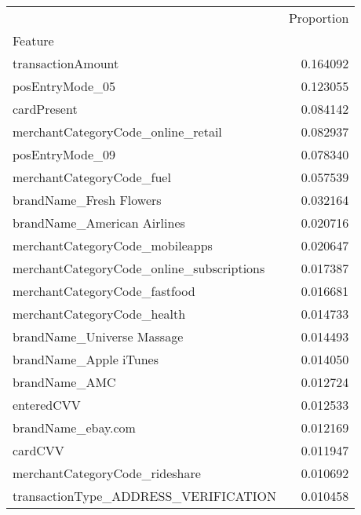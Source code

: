 \begin{tabu}{lr}
\toprule
 & Proportion \\
Feature &  \\
\midrule
transactionAmount & 0.164092 \\
posEntryMode\_05 & 0.123055 \\
cardPresent & 0.084142 \\
merchantCategoryCode\_online\_retail & 0.082937 \\
posEntryMode\_09 & 0.078340 \\
merchantCategoryCode\_fuel & 0.057539 \\
brandName\_Fresh Flowers & 0.032164 \\
brandName\_American Airlines & 0.020716 \\
merchantCategoryCode\_mobileapps & 0.020647 \\
merchantCategoryCode\_online\_subscriptions & 0.017387 \\
merchantCategoryCode\_fastfood & 0.016681 \\
merchantCategoryCode\_health & 0.014733 \\
brandName\_Universe Massage & 0.014493 \\
brandName\_Apple iTunes & 0.014050 \\
brandName\_AMC & 0.012724 \\
enteredCVV & 0.012533 \\
brandName\_ebay.com & 0.012169 \\
cardCVV & 0.011947 \\
merchantCategoryCode\_rideshare & 0.010692 \\
transactionType\_ADDRESS\_VERIFICATION & 0.010458 \\
\bottomrule
\end{tabu}